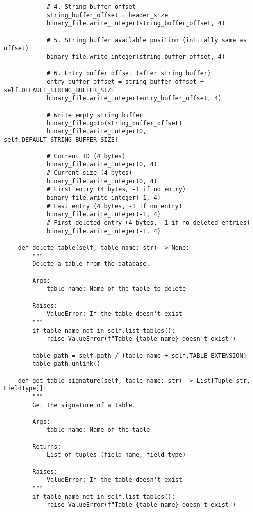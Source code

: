 \documentclass[utf8]{article}
\begin{document}
\begin{verbatim}
            # 4. String buffer offset
            string_buffer_offset = header_size
            binary_file.write_integer(string_buffer_offset, 4)
            
            # 5. String buffer available position (initially same as offset)
            binary_file.write_integer(string_buffer_offset, 4)
            
            # 6. Entry buffer offset (after string buffer)
            entry_buffer_offset = string_buffer_offset + self.DEFAULT_STRING_BUFFER_SIZE
            binary_file.write_integer(entry_buffer_offset, 4)
            
            # Write empty string buffer
            binary_file.goto(string_buffer_offset)
            binary_file.write_integer(0, self.DEFAULT_STRING_BUFFER_SIZE)
            
            # Current ID (4 bytes)
            binary_file.write_integer(0, 4)
            # Current size (4 bytes)
            binary_file.write_integer(0, 4)
            # First entry (4 bytes, -1 if no entry)
            binary_file.write_integer(-1, 4)
            # Last entry (4 bytes, -1 if no entry)
            binary_file.write_integer(-1, 4)
            # First deleted entry (4 bytes, -1 if no deleted entries)
            binary_file.write_integer(-1, 4)
    
    def delete_table(self, table_name: str) -> None:
        """
        Delete a table from the database.
        
        Args:
            table_name: Name of the table to delete
        
        Raises:
            ValueError: If the table doesn't exist
        """
        if table_name not in self.list_tables():
            raise ValueError(f"Table {table_name} doesn't exist")
        
        table_path = self.path / (table_name + self.TABLE_EXTENSION)
        table_path.unlink()
    
    def get_table_signature(self, table_name: str) -> List[Tuple[str, FieldType]]:
        """
        Get the signature of a table.
        
        Args:
            table_name: Name of the table
        
        Returns:
            List of tuples (field_name, field_type)
        
        Raises:
            ValueError: If the table doesn't exist
        """
        if table_name not in self.list_tables():
            raise ValueError(f"Table {table_name} doesn't exist")
        

\end{verbatim}
\end{document}
